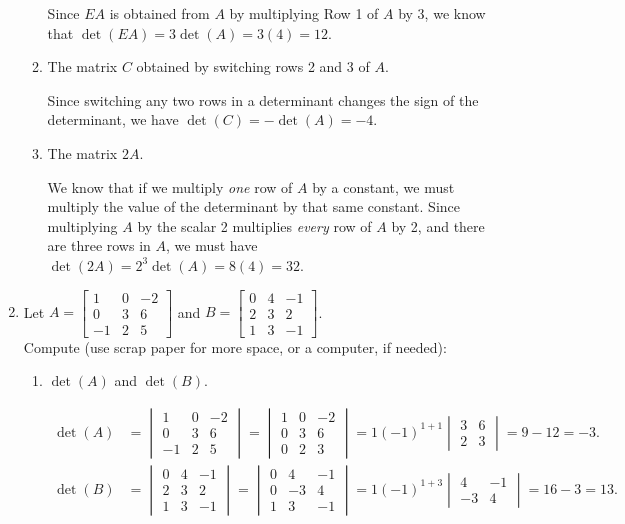 \documentclass[12pt]{article}
\newcommand{\bbm}{\begin{bmatrix}}
\newcommand{\ebm}{\end{bmatrix}}
\newcommand{\bvm}{\begin{vmatrix}}
\newcommand{\evm}{\end{vmatrix}}
\begin{document}
\begin{enumerate}
\begin{enumerate}
Since $EA$ is obtained from $A$ by multiplying Row 1 of $A$ by 3, we know that $\det(EA) = 3\det(A) = 3(4)=12$.

\medskip

 \item The matrix $C$ obtained by switching rows 2 and 3 of $A$.

\medskip

Since switching any two rows in a determinant changes the sign of the determinant, we have $\det(C) = -\det(A) = -4$.

\medskip

 \item The matrix $2A$.

\medskip

We know that if we multiply \textit{one} row of $A$ by a constant, we must multiply the value of the determinant by that same constant. Since multiplying $A$ by the scalar 2 multiplies \textit{every} row of $A$ by 2, and there are three rows in $A$, we must have $\det(2A) = 2^3\det(A) = 8(4)=32$.
\end{enumerate}

\medskip

\item Let $A = \bbm 1&0&-2\\0&3&6\\-1&2&5\ebm$ and $B = \bbm 0&4&-1\\2&3&2\\1&3&-1\ebm$.\\Compute (use scrap paper for more space, or a computer, if needed):
\begin{enumerate}
 \item $\det(A)$ and $\det(B)$.

\begin{align*}
 \det(A) &= \bvm 1&0&-2\\0&3&6\\-1&2&5\evm = \bvm 1&0&-2\\0&3&6\\0&2&3\evm = 1(-1)^{1+1}\bvm 3&6\\2&3\evm = 9-12=-3.\\
 \det(B) & = \bvm 0&4&-1\\2&3&2\\1&3&-1\evm = \bvm 0&4&-1\\0&-3&4\\1&3&-1\evm = 1(-1)^{1+3}\bvm 4&-1\\-3&4\evm = 16-3=13.
\end{align*}



\end{enumerate}
\end{enumerate}
\end{document}
